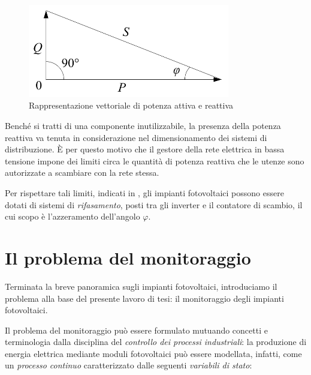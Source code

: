 %
\begin{figure}[!h]
\centering
\includegraphics[width=250pt]{img/apparent-power.png}
\caption{Rappresentazione vettoriale di potenza attiva e reattiva}
\label{potenzaattivareattiva}
\end{figure}
%
Bench\'e si tratti di una componente inutilizzabile, la presenza della potenza 
reattiva va tenuta in considerazione nel dimensionamento dei sistemi di 
distribuzione. \`E per questo motivo che il gestore della rete elettrica in 
bassa tensione impone dei limiti circa le quantit\`a di potenza reattiva 
che le utenze sono autorizzate a scambiare con la rete stessa.
%

%
Per rispettare tali limiti, indicati in \cite{criteriallacciamento}, gli impianti 
fotovoltaici possono essere dotati di sistemi di \emph{rifasamento}, posti 
tra gli inverter e il contatore di scambio, il cui scopo \`e l'azzeramento 
dell'angolo $\varphi$.
%

%
\section{Il problema del monitoraggio}
Terminata la breve panoramica sugli impianti fotovoltaici, introduciamo il 
problema alla base del presente lavoro di tesi: il monitoraggio degli impianti 
fotovoltaici.
%

%
Il problema del monitoraggio pu\`o essere formulato mutuando concetti e 
terminologia dalla disciplina del \emph{controllo dei processi industriali}: 
la produzione di energia elettrica mediante moduli fotovoltaici pu\`o essere
modellata, infatti, come un \emph{processo continuo} caratterizzato dalle 
seguenti \emph{variabili di stato}:
%
\begin{itemize}

\end{itemize}








